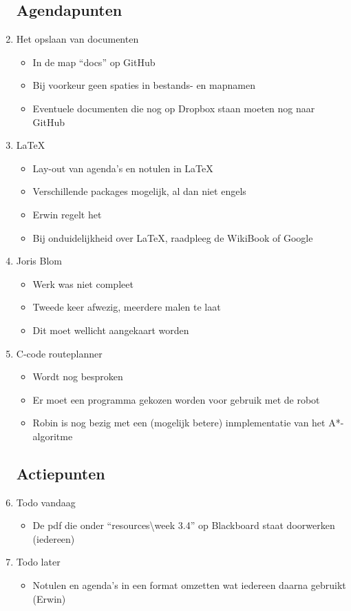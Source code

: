 \documentclass{article}
\begin{document}
\begin{enumerate}
	\subsection*{Agendapunten}
	\item Het opslaan van documenten
	\begin{itemize}
		\item In de map ``docs'' op GitHub
		\item Bij voorkeur geen spaties in bestands- en mapnamen
		\item Eventuele documenten die nog op Dropbox staan moeten nog naar GitHub
	\end{itemize}
	\item LaTeX
	\begin{itemize}
		\item Lay-out van agenda's en notulen in LaTeX
		\item Verschillende packages mogelijk, al dan niet engels
		\item Erwin regelt het
		\item Bij onduidelijkheid over LaTeX, raadpleeg de WikiBook of Google
	\end{itemize}
	\item Joris Blom
	\begin{itemize}
		\item Werk was niet compleet
		\item Tweede keer afwezig, meerdere malen te laat
		\item Dit moet wellicht aangekaart worden
	\end{itemize}
	\item C-code routeplanner
	\begin{itemize}
		\item Wordt nog besproken
		\item Er moet een programma gekozen worden voor gebruik met de robot
		\item Robin is nog bezig met een (mogelijk betere) inmplementatie van het A*-algoritme
	\end{itemize}

	\subsection*{Actiepunten}
	\item Todo vandaag
	\begin{itemize}
		\item De pdf die onder ``resources\textbackslash week 3.4'' op Blackboard staat doorwerken (iedereen)
	\end{itemize}
	\item Todo later
	\begin{itemize}
		\item Notulen en agenda's in een format omzetten wat iedereen daarna gebruikt (Erwin)
	\end{itemize}


\end{enumerate}
\end{document}
